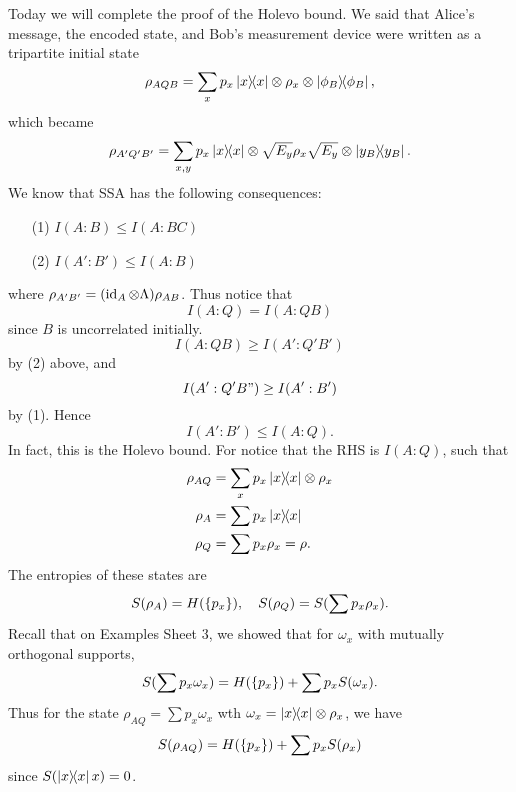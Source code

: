 Today we will complete the proof of the Holevo bound. We said that Alice's message, the encoded state, and Bob's measurement device were written as a tripartite initial state
\begin{equation}
    \rho_{AQB}=\sum_x p_x \left\lvert{x}\middle\rangle\!\middle\langle{x}\right\rvert \otimes \rho_x \otimes \left\lvert{\phi_B}\middle\rangle\!\middle\langle{\phi_B}\right\rvert,
\end{equation}
which became
\begin{equation}
    \rho_{A'Q'B'} = \sum_{x,y} p_x \left\lvert{x}\middle\rangle\!\middle\langle{x}\right\rvert \otimes \sqrt{E_y} \rho_x \sqrt{E_y} \otimes \left\lvert{y_B}\middle\rangle\!\middle\langle{y_B}\right\rvert.
\end{equation}
We know that SSA has the following consequences:
\begin{enumerate}
    \item[(1)] $I(A:B) \leq I(A:BC)$
    \item [(2)] $I(A':B')\leq I(A:B)$
\end{enumerate}
where $\rho_{A'B'}=(\operatorname{id}_A \otimes \Lambda) \rho_{AB}$. Thus notice that
\begin{equation}
    I(A:Q) = I(A:QB)
\end{equation}
since $B$ is uncorrelated initially.
\begin{equation}
    I(A:QB) \geq I(A': Q'B')
\end{equation}
by (2) above, and 
\begin{equation}
    I(A':Q'B") \geq I(A': B')
\end{equation}
by (1). Hence
\begin{equation}
    I(A':B')\leq I(A:Q).
\end{equation}
In fact, this is the Holevo bound. For notice that the RHS is $I(A:Q)$, such that
\begin{align*}
    \rho_{AQ}&= \sum_x p_x \left\lvert{x}\middle\rangle\!\middle\langle{x}\right\rvert \otimes \rho_x\\
    \rho_A &= \sum p_x \left\lvert{x}\middle\rangle\!\middle\langle{x}\right\rvert\\
    \rho_Q &= \sum p_x \rho_x = \rho.
\end{align*}
The entropies of these states are
\begin{equation}
    S(\rho_A) = H(\{p_x\}),\quad S(\rho_Q)=S(\sum p_x \rho_x).
\end{equation}
Recall that on Examples Sheet 3, we showed that for $\omega_x$ with mutually orthogonal supports,
\begin{equation}
    S(\sum p_x \omega_x) = H(\{p_x\}) + \sum p_x S(\omega_x).
\end{equation}
Thus for the state $\rho_{AQ}=\sum p_x \omega_x$ wth $\omega_x=\left\lvert{x}\middle\rangle\!\middle\langle{x}\right\rvert \otimes \rho_x$, we have
\begin{equation}
    S(\rho_{AQ})=H(\{p_x\}) +\sum p_x S(\rho_x)
\end{equation}
since $S(\left\lvert{x}\middle\rangle\!\middle\langle{x}\right\rvert{x})=0$.

